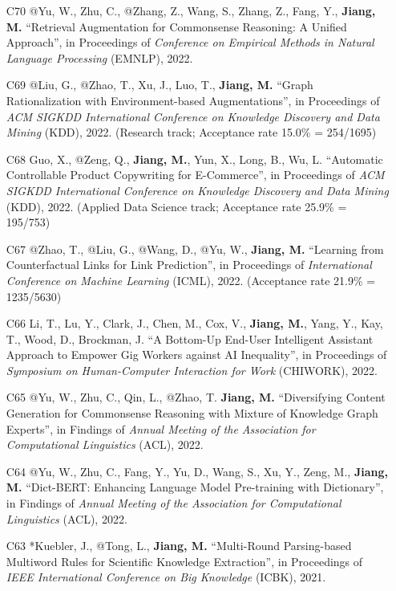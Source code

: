 \documentclass[10pt]{article}
\newenvironment{myindentpar}[1]%
{\begin{list}{}%
         {\setlength{\leftmargin}{#1}}%
         \item[]%
}
{\end{list}}
\newcounter{list}
\begin{document}
\begin{myindentpar}{0.00cm}
\begin{enumerate}[leftmargin=.5cm]
\item[C70] @Yu, W., Zhu, C., @Zhang, Z., Wang, S., Zhang, Z., Fang, Y., \textbf{Jiang, M.} ``Retrieval Augmentation for Commonsense Reasoning: A Unified Approach'', in Proceedings of \textit{Conference on Empirical Methods in Natural Language Processing} (EMNLP), 2022.

\item[C69] @Liu, G., @Zhao, T., Xu, J., Luo, T., \textbf{Jiang, M.} ``Graph Rationalization with Environment-based Augmentations'', in Proceedings of \textit{ACM SIGKDD International Conference on Knowledge Discovery and Data Mining} (KDD), 2022. (Research track; Acceptance rate 15.0\% = 254/1695)

\item[C68] Guo, X., @Zeng, Q., \textbf{Jiang, M.}, Yun, X., Long, B., Wu, L. ``Automatic Controllable Product Copywriting for E-Commerce'', in Proceedings of \textit{ACM SIGKDD International Conference on Knowledge Discovery and Data Mining} (KDD), 2022. (Applied Data Science track; Acceptance rate 25.9\% = 195/753)

\item[C67] @Zhao, T., @Liu, G., @Wang, D., @Yu, W., \textbf{Jiang, M.} ``Learning from Counterfactual Links for Link Prediction'', in Proceedings of \textit{International Conference on Machine Learning} (ICML), 2022. (Acceptance rate 21.9\% = 1235/5630)

\item[C66] Li, T., Lu, Y., Clark, J., Chen, M., Cox, V., \textbf{Jiang, M.}, Yang, Y., Kay, T., Wood, D., Brockman, J. ``A Bottom-Up End-User Intelligent Assistant Approach to Empower Gig Workers against AI Inequality'', in Proceedings of \textit{Symposium on Human-Computer Interaction for Work} (CHIWORK), 2022.
		
\item[C65] @Yu, W., Zhu, C., Qin, L., @Zhao, T. \textbf{Jiang, M.} ``Diversifying Content Generation for Commonsense Reasoning with Mixture of Knowledge Graph Experts'', in Findings of \textit{Annual Meeting of the Association for Computational Linguistics} (ACL), 2022.

\item[C64] @Yu, W., Zhu, C., Fang, Y., Yu, D., Wang, S., Xu, Y., Zeng, M., \textbf{Jiang, M.} ``Dict-BERT: Enhancing Language Model Pre-training with Dictionary'', in Findings of \textit{Annual Meeting of the Association for Computational Linguistics} (ACL), 2022.

\item[C63] *Kuebler, J., @Tong, L., \textbf{Jiang, M.} ``Multi-Round Parsing-based Multiword Rules for Scientific Knowledge Extraction'', in Proceedings of \textit{IEEE International Conference on Big Knowledge} (ICBK), 2021.
		

\end{enumerate}
\end{myindentpar}
\end{document}
